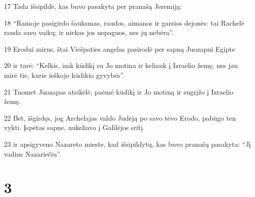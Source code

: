 \par 17 Tada išsipildė, kas buvo pasakyta per pranašą Jeremiją: 
\par 18 “Ramoje pasigirdo šauksmas, raudos, aimanos ir garsios dejonės: tai Rachelė rauda savo vaikų; ir niekas jos nepaguos, nes jų nebėra”. 
\par 19 Erodui mirus, štai Viešpaties angelas pasirodė per sapną Juozapui Egipte 
\par 20 ir tarė: “Kelkis, imk kūdikį su Jo motina ir keliauk į Izraelio žemę, nes jau mirė tie, kurie ieškojo kūdikio gyvybės”. 
\par 21 Tuomet Juozapas atsikėlė, paėmė kūdikį ir Jo motiną ir sugrįžo į Izraelio žemę. 
\par 22 Bet, išgirdęs, jog Archelajas valdo Judėją po savo tėvo Erodo, pabūgo ten vykti. Įspėtas sapne, nukeliavo į Galilėjos sritį 
\par 23 ir apsigyveno Nazareto mieste, kad išsipildytų, kas buvo pranašų pasakyta: “Jį vadins Nazariečiu”.



\chapter{3}


